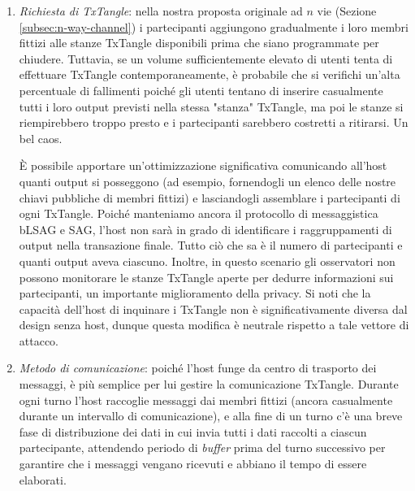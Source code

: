 \begin{enumerate}
    \item \emph{Richiesta di TxTangle}: nella nostra proposta originale ad $n$ vie (Sezione \ref{subsec:n-way-channel}) i partecipanti aggiungono gradualmente i loro membri fittizi alle stanze TxTangle disponibili prima che siano programmate per chiudere. Tuttavia, se un volume sufficientemente elevato di utenti tenta di effettuare TxTangle contemporaneamente, è probabile che si verifichi un'alta percentuale di fallimenti poiché gli utenti tentano di inserire casualmente tutti i loro output previsti nella stessa "stanza" TxTangle, ma poi le stanze si riempirebbero troppo presto e i partecipanti sarebbero costretti a ritirarsi. Un bel caos.

    È possibile apportare un'ottimizzazione significativa comunicando all'host quanti output si posseggono (ad esempio, fornendogli un elenco delle nostre chiavi pubbliche di membri fittizi) e lasciandogli assemblare i partecipanti di ogni TxTangle. Poiché manteniamo ancora il protocollo di messaggistica bLSAG e SAG, l'host non sarà in grado di identificare i raggruppamenti di output nella transazione finale. Tutto ciò che sa è il numero di partecipanti e quanti output aveva ciascuno. Inoltre, in questo scenario gli osservatori non possono monitorare le stanze TxTangle aperte per dedurre informazioni sui partecipanti, un importante miglioramento della privacy. Si noti che la capacità dell'host di inquinare i TxTangle non è significativamente diversa dal design senza host, dunque questa modifica è neutrale rispetto a tale vettore di attacco.
    \item \emph{Metodo di comunicazione}: poiché l'host funge da centro di trasporto dei messaggi, è più semplice per lui gestire la comunicazione TxTangle. Durante ogni turno l'host raccoglie messaggi dai membri fittizi (ancora casualmente durante un intervallo di comunicazione), e alla fine di un turno c'è una breve fase di distribuzione dei dati in cui invia tutti i dati raccolti a ciascun partecipante, attendendo periodo di \emph{buffer} prima del turno successivo per garantire che i messaggi vengano ricevuti e abbiano il tempo di essere elaborati. %

\end{enumerate}
